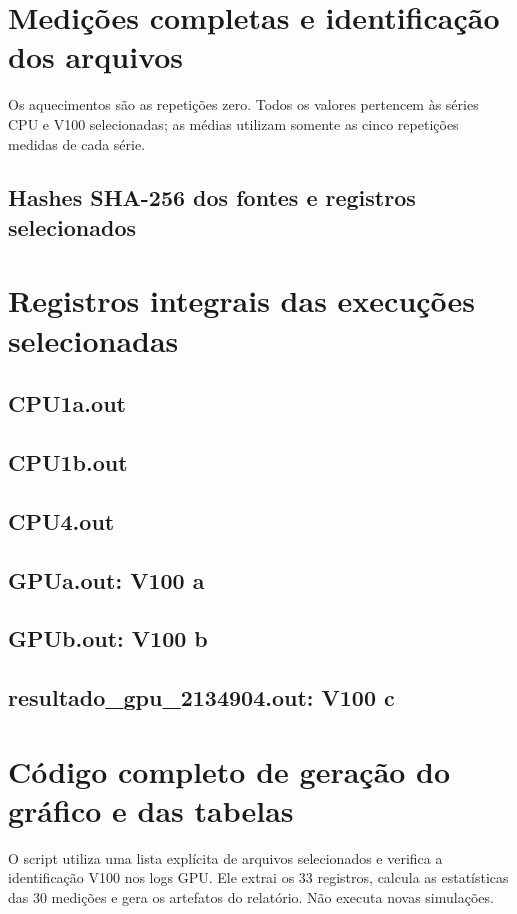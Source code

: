 \documentclass[12pt,a4paper]{article}
\begin{document}
\clearpage\section{Medições completas e identificação dos arquivos}
Os aquecimentos são as repetições zero. Todos os valores pertencem às séries CPU e V100 selecionadas; as médias utilizam somente as cinco repetições medidas de cada série.
{\small}
\subsection{Hashes SHA-256 dos fontes e registros selecionados}


\clearpage\section{Registros integrais das execuções selecionadas}
\subsection{CPU1a.out}

\clearpage\subsection{CPU1b.out}

\clearpage\subsection{CPU4.out}

\clearpage\subsection{GPUa.out: V100 a}

\clearpage\subsection{GPUb.out: V100 b}

\clearpage\subsection{resultado\_gpu\_2134904.out: V100 c}


\clearpage\section{Código completo de geração do gráfico e das tabelas}
O script utiliza uma lista explícita de arquivos selecionados e verifica a identificação V100 nos logs GPU. Ele extrai os 33 registros, calcula as estatísticas das 30 medições e gera os artefatos do relatório. Não executa novas simulações.

\end{document}
